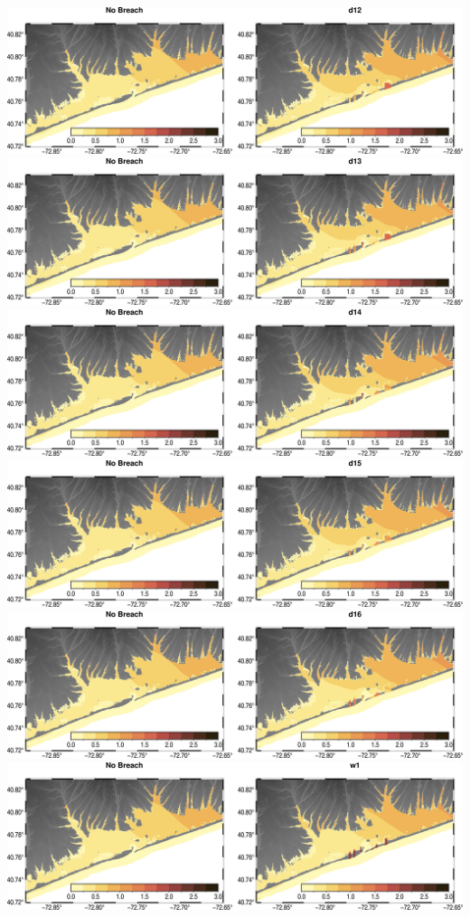 \includegraphics[width=\textwidth]{images/fgmax/d12_fgmax_no_lines.png}
\includegraphics[width=\textwidth]{images/fgmax/d13_fgmax_no_lines.png}
\includegraphics[width=\textwidth]{images/fgmax/d14_fgmax_no_lines.png}
\includegraphics[width=\textwidth]{images/fgmax/d15_fgmax_no_lines.png}
\includegraphics[width=\textwidth]{images/fgmax/d16_fgmax_no_lines.png}
\includegraphics[width=\textwidth]{images/fgmax/w1_fgmax_no_lines.png}
